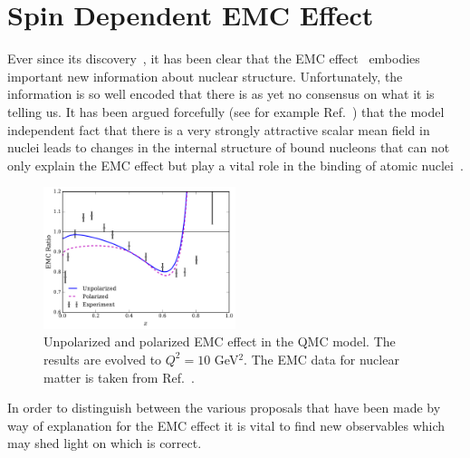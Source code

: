 \section{Spin Dependent EMC Effect}

Ever since its discovery~\cite{Aubert:1983xm,Bodek:1983ec}, it has been clear that the EMC 
effect~\cite{Geesaman:1995yd} embodies important new information about nuclear structure. Unfortunately, the information is so well encoded that there is as yet no consensus on what it is telling us. It has been argued forcefully (see for example Ref.~\cite{Thomas:2016bxx,Guichon:2018uew}) that the model independent fact that there is a very strongly attractive scalar mean field in nuclei leads to changes in the internal structure of bound nucleons that can not only explain the EMC effect but play a vital role in the binding of atomic nuclei~\cite{Stone:2017oqt,Stone:2016qmi}. 
%
    \begin{figure}[h!]
        \includegraphics[width=0.5\textwidth]{plots/EMC_Com_NLO_PDF.pdf}
        \caption{Unpolarized and polarized EMC effect in the QMC model. The results are evolved to $Q^2=10$ GeV$^2$. The EMC data for nuclear matter is taken from Ref.~\cite{Sick:1992pw}.}
	\label{fig:EMC_Com}
    \end{figure}
%

In order to distinguish between the various proposals that have been made by way of explanation for the EMC effect it is vital to find new observables which may shed light on which is correct. %

